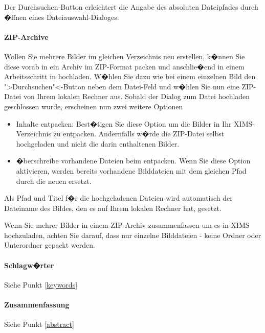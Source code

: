 Der Durchsuchen-Button erleichtert die Angabe des absoluten Dateipfades durch
�ffnen eines Dateiauswahl-Dialoges.

\paragraph{ZIP-Archive}
\label{zip-archives}
Wollen Sie mehrere Bilder im gleichen Verzeichnis neu erstellen, k�nnen Sie diese vorab in ein Archiv im ZIP-Format packen und anschlie�end in einem Arbeitsschritt in  hochladen. W�hlen Sie dazu wie bei einem einzelnen Bild den ">Durchsuchen"<-Button neben dem Datei-Feld und w�hlen Sie nun eine ZIP-Datei von Ihrem lokalen Rechner aus. Sobald der Dialog zum Datei hochladen geschlossen wurde, erscheinen nun zwei weitere Optionen

\begin{itemize}
	\item Inhalte entpacken: Best�tigen Sie diese Option um die Bilder in Ihr XIMS-Verzeichnis zu entpacken. Andernfalls w�rde die ZIP-Datei selbst hochgeladen und nicht die darin enthaltenen Bilder. 
	\item �berschreibe vorhandene Dateien beim entpacken. Wenn Sie diese Option aktivieren, werden bereits vorhandene Bilddateien mit 
	dem gleichen Pfad 
	durch die neuen ersetzt.
\end{itemize}

Als 
Pfad
 und Titel f�r die hochgeladenen Dateien wird automatisch der Dateiname des Bildes, den es auf Ihrem lokalen Rechner hat, gesetzt.

\begin{Hinweis}
  Wenn Sie mehrer Bilder in einem ZIP-Archiv zusammenfassen um es in XIMS hochzuladen, achten Sie darauf, dass nur einzelne Bilddateien - keine Ordner oder Unterordner gepackt werden.
\end{Hinweis}

\paragraph{Schlagw�rter}

Siehe Punkt \ref{keywords}

\paragraph{Zusammenfassung}

Siehe Punkt \ref{abstract}


